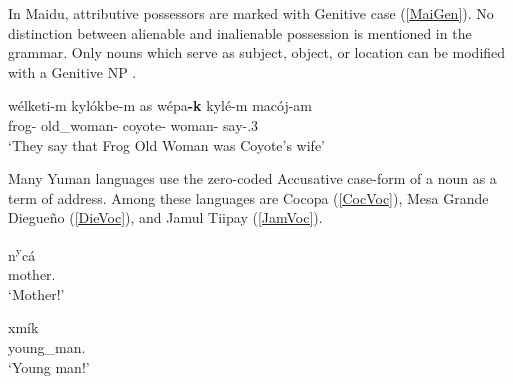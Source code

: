 

In Maidu, attributive possessors are marked with {Genitive} case (\ref{MaiGen}).  
No distinction between alienable and inalienable possession is mentioned in the grammar. 
Only nouns which serve as subject, object, or location can be modified with a {Genitive} NP \citep[30--31]{Shipley:1964}.

\begin{exe}\ex \label{MaiGen}
\raggedright
\gll w\'elk\textraiseglotstop et\textraiseglotstop i-m kyl\'okbe-m {\textglotstop}as w\'epa\textbf{-k} kyl\'e-m mac\textraiseglotstop \'oj-{\textglotstop}am\\
frog-\nom{} old\_woman-\nom{} \emphat{} coyote-\gen{} woman-\nom{} say-\pstpunc{}.3\\
\glt `They say that Frog Old Woman was Coyote's wife'
\end{exe}


Many Yuman languages use the zero-coded Accusative case-form of a noun as a term of address.
Among these languages are Cocopa (\ref{CocVoc}),  Mesa Grande Diegue\~no (\ref{DieVoc}), and Jamul Tiipay (\ref{JamVoc}). 

\begin{exe}\ex\label{CocVoc}
\begin{xlist}
\ex\gll n\textsuperscript{y}c\'a\\
mother.\acc{}\\
\glt `Mother!'

\ex\gll xm\'ik\\
young\_man.\acc{}\\
\glt `Young man!'
\end{xlist}
\end{exe}

